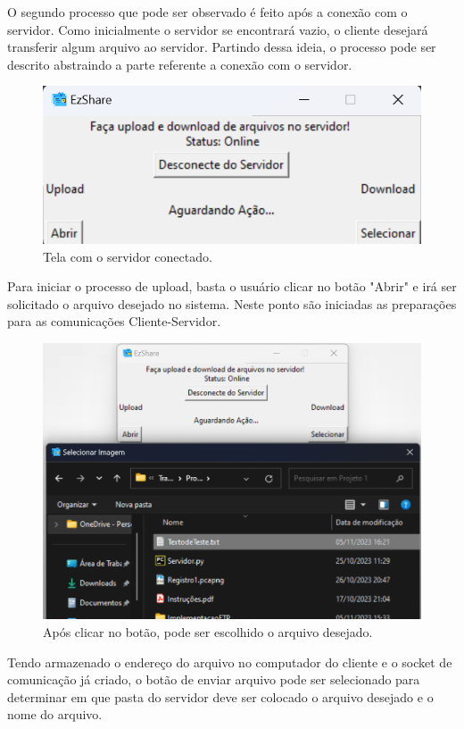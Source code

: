 \documentclass[11pt]{IEEEtran}
\begin{document}
O segundo processo que pode ser observado é feito após a conexão com o servidor. Como inicialmente o servidor se encontrará vazio, o cliente desejará transferir algum arquivo ao servidor. Partindo dessa ideia, o processo pode ser descrito abstraindo a parte referente a conexão com o servidor. 

\begin{figure}[h]
   \centering
   \includegraphics[width = 0.8\linewidth]{TelaConectada.png}  
   \caption{Tela com o servidor conectado.}
   \label{fig:Tela inicial Conectada}
\end{figure}

Para iniciar o processo de upload, basta o usuário clicar no botão "Abrir" e irá ser solicitado o arquivo desejado no sistema. Neste ponto são iniciadas as preparações para as comunicações Cliente-Servidor.

\begin{figure}[h]
   \centering
   \includegraphics[width = 0.8\linewidth]{SelecionarArquivo.png}  
   \caption{Após clicar no botão, pode ser escolhido o arquivo desejado.}
   \label{fig:Tela inicial Conectada}
\end{figure}

Tendo armazenado o endereço do arquivo no computador do cliente e o socket de comunicação já criado, o botão de enviar arquivo pode ser selecionado para determinar em que pasta do servidor deve ser colocado o arquivo desejado e o nome do arquivo.
\end{document}
